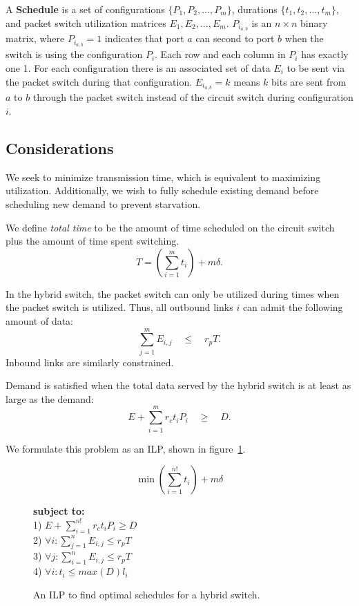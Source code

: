 A \textbf{Schedule} is a set of configurations $\{P_1, P_2, \dots, P_m\}$, durations
$\{t_1, t_2, \dots, t_m\}$, and packet switch utilization matrices ${E_1, E_2, \dots, E_m}$.
$P_{i_{a, b}}$ is an $n \times n$ binary matrix, where $P_{i_{a, b}} = 1$ indicates that
port $a$ can second to port $b$ when the switch is using the configuration $P_i$.
Each row and each column in $P_i$ has exactly one 1.
For each configuration there is an associated set of data $E_i$ to be sent via the
packet switch during that configuration.
$E_{i_{a, b}} = k$ means $k$ bits are sent from $a$ to $b$ through the packet switch instead
of the circuit switch during configuration $i$.


\subsection{Considerations}
We seek to minimize transmission time, which is equivalent to maximizing utilization.
Additionally, we wish to fully schedule existing demand before scheduling
new demand to prevent starvation.

We define {\it total time} to be the amount of time scheduled
on the circuit switch plus the amount of time spent switching.
\[T = \left(\sum_{i=1}^{m} t_i\right) + m\delta.\]

In the hybrid switch, the packet switch can only be utilized during times when
the packet switch is utilized. Thus, all outbound links $i$ can admit the following
amount of data:
\[\sum_{j=1}^{m} E_{i,j} \quad\leq\quad r_p T.\]
Inbound links are similarly constrained.

Demand is satisfied when the total data served by the hybrid switch is at least
as large as the demand:
\[E + \sum_{i=1}^{m} r_c t_i P_i \quad\geq\quad D.\]

We formulate this problem as an ILP, shown in figure~\ref{fig:hybrid-optimization}.

\begin{figure}[t]
\small
\centering
\begin{mdframed}
\[
\min \left(\sum_{i=1}^{n!} t_i\right) + m\delta
\]
\begin{tabbing}
\textbf{subject to:}\\[4pt]
1) $E + \sum_{i=1}^{n!} r_c t_i P_i \geq D$\\[4pt]
2) $\forall i: \sum_{j=1}^{n} E_{i,j} \leq r_p T$\\[4pt]
3) $\forall j: \sum_{i=1}^{n} E_{i,j} \leq r_p T$\\[4pt]
4) $\forall i: t_i \leq \textit{max}(D) l_i$
\end{tabbing}
\end{mdframed}
\caption{An ILP to find optimal schedules for a hybrid switch.}
\label{fig:hybrid-optimization}
\end{figure}

